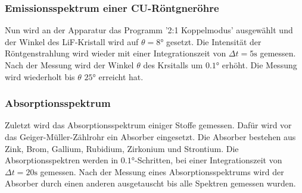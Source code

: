 \subsubsection{Emissionsspektrum einer CU-Röntgneröhre}
\label{sec:emission}
Nun wird an der Apparatur das Programm '2:1 Koppelmodus' ausgewählt und der Winkel des LiF-Kristall wird auf $\theta = 8 \si{\degree}$ gesetzt.
Die Intensität der Röntgenstrahlung wird wieder mit einer Integrationszeit von $\Delta t = 5 \si{\second}$ gemessen.
Nach der Messung wird der Winkel $\theta$ des Krsitalls um $0.1 \si{\degree}$ erhöht.
Die Messung wird wiederholt bis $\theta$ $25\si{\degree}$ erreicht hat.

\subsubsection{Absorptionsspektrum}
\label{sec:abso}
Zuletzt wird das Absorptionsspektrum einiger Stoffe gemessen.
Dafür wird vor das Geiger-Müller-Zählrohr ein Absorber eingesetzt.
Die Absorber bestehen aus Zink, Brom, Gallium, Rubidium, Zirkonium und Strontium.
Die Absorptionsspektren werden in $0.1\si{\degree}$-Schritten, bei einer Integrationszeit von $\Delta t = 20 \si{\second}$ gemessen.
Nach der Messung eines Absorptionsspektrums wird der Absorber durch einen anderen ausgetauscht bis alle Spektren gemessen wurden.
